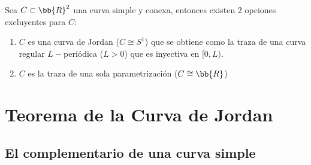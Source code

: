 \begin{teo}\label{teo:clasif}
    Sea $C\subset \bb{R}^2$ una curva simple y conexa, entonces existen 2 opciones excluyentes para $C$:
    \begin{enumerate}[label=\alph*)]
        \item $C$ es una curva de Jordan ($C \cong S^1$) que se obtiene como la traza de una curva regular $L-$periódica ($L>0$) que es inyectiva en $[0,L)$.
        \item $C$ es la traza de una sola parametrización ($C\cong \bb{R}$)
    \end{enumerate}
\end{teo}

\section{Teorema de la Curva de Jordan}

\subsection{El complementario de una curva simple}

